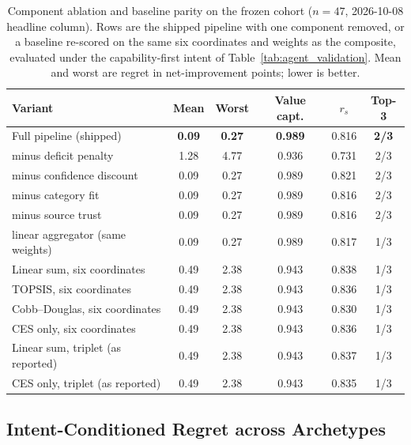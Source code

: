 \documentclass[pdflatex,sn-mathphys-num]{sn-jnl}
\theoremstyle{thmstyleone}
\theoremstyle{thmstylethree}
\begin{document}
\begin{table}[!htbp]
\caption{Component ablation and baseline parity on the frozen cohort ($n{=}47$, 2026-10-08 headline column). Rows are the shipped pipeline with one component removed, or a baseline re-scored on the same six coordinates and weights as the composite, evaluated under the capability-first intent of Table~\ref{tab:agent_validation}. Mean and worst are regret in net-improvement points; lower is better.}\label{tab:component_ablation}
\centering
\footnotesize
\setlength{\tabcolsep}{4pt}
\begin{tabular*}{\linewidth}{@{\extracolsep{\fill}}lccccc@{}}
\toprule
\textbf{Variant} & \textbf{Mean} & \textbf{Worst} & \textbf{Value capt.} & \textbf{$r_s$} & \textbf{Top-3} \\
\midrule
Full pipeline (shipped)          & \textbf{0.09} & \textbf{0.27} & \textbf{0.989} & 0.816 & \textbf{2/3} \\
minus deficit penalty            & 1.28 & 4.77 & 0.936 & 0.731 & 2/3 \\
minus confidence discount        & 0.09 & 0.27 & 0.989 & 0.821 & 2/3 \\
minus category fit               & 0.09 & 0.27 & 0.989 & 0.816 & 2/3 \\
minus source trust               & 0.09 & 0.27 & 0.989 & 0.816 & 2/3 \\
linear aggregator (same weights) & 0.09 & 0.27 & 0.989 & 0.817 & 1/3 \\
\midrule
Linear sum, six coordinates      & 0.49 & 2.38 & 0.943 & 0.838 & 1/3 \\
TOPSIS, six coordinates          & 0.49 & 2.38 & 0.943 & 0.836 & 1/3 \\
Cobb--Douglas, six coordinates   & 0.49 & 2.38 & 0.943 & 0.830 & 1/3 \\
CES only, six coordinates        & 0.49 & 2.38 & 0.943 & 0.836 & 1/3 \\
\midrule
Linear sum, triplet (as reported) & 0.49 & 2.38 & 0.943 & 0.837 & 1/3 \\
CES only, triplet (as reported)   & 0.49 & 2.38 & 0.943 & 0.835 & 1/3 \\
\bottomrule
\end{tabular*}
\end{table}

\subsection{Intent-Conditioned Regret across Archetypes}\label{subsec:archetype_regret}
\end{document}
